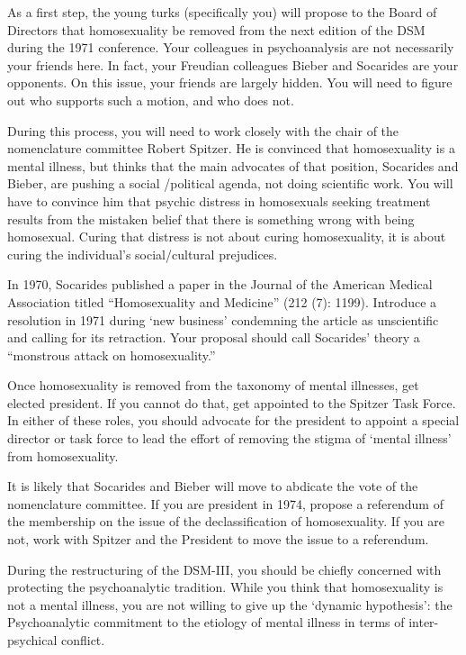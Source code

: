 As a first step, the young turks (specifically you) will propose to the Board of Directors that homosexuality be removed from the next edition of the DSM during the 1971 conference. Your colleagues in psychoanalysis are not necessarily your friends here. In fact, your Freudian colleagues Bieber and Socarides are your opponents. On this issue, your friends are largely hidden. You will need to figure out who supports such a motion, and who does not.

During this process, you will need to work closely with the chair of the nomenclature committee Robert Spitzer. He is convinced that homosexuality is a mental illness, but thinks that the main advocates of that position, Socarides and Bieber, are pushing a social \slash  political agenda, not doing scientific work. You will have to convince him that psychic distress in homosexuals seeking treatment results from the mistaken belief that there is something wrong with being homosexual. Curing that distress is not about curing homosexuality, it is about curing the individual's social\slash cultural prejudices.

In 1970, Socarides published a paper in the Journal of the American Medical Association titled ``Homosexuality and Medicine'' (212 (7): 1199). Introduce a resolution in 1971 during `new business' condemning the article as unscientific and calling for its retraction. Your proposal should call Socarides' theory a ``monstrous attack on homosexuality.''

Once homosexuality is removed from the taxonomy of mental illnesses, get elected president. If you cannot do that, get appointed to the Spitzer Task Force. In either of these roles, you should advocate for the president to appoint a special director or task force to lead the effort of removing the stigma of `mental illness' from homosexuality.

It is likely that Socarides and Bieber will move to abdicate the vote of the nomenclature committee. If you are president in 1974, propose a referendum of the membership on the issue of the declassification of homosexuality. If you are not, work with Spitzer and the President to move the issue to a referendum.

During the restructuring of the DSM-III, you should be chiefly concerned with protecting the psychoanalytic tradition. While you think that homosexuality is not a mental illness, you are not willing to give up the `dynamic hypothesis': the Psychoanalytic commitment to the etiology of mental illness in terms of inter-psychical conflict.


